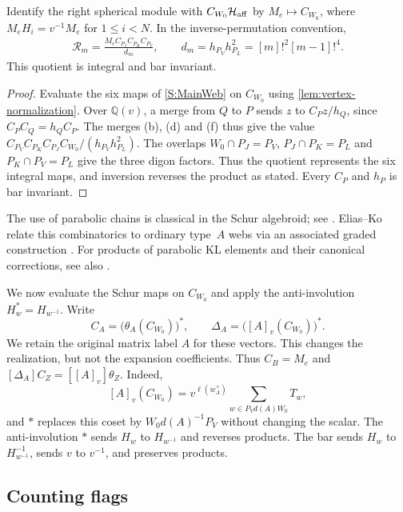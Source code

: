 \documentclass[a4paper,11pt]{amsart}
\numberwithin{equation}{subsection}
\theoremstyle{plain}
\theoremstyle{definition}
\theoremstyle{remark}
\begin{document}
\begin{lemma}\label{lem:main-symmetrizer}
Identify the right spherical module with $C_{W_0}\mathcal H_{\rm aff}$
by $M_e\mapsto C_{W_0}$, where $M_eH_i=v^{-1}M_e$ for $1\le i<N$.
In the inverse-permutation convention,
\begin{gather}\label{eq:marked-symmetrizer}
\mathcal R_m=\frac{M_eC_{P_J}C_{P_K}C_{P_V}}{d_m},\qquad
d_m=h_{P_V}h_{P_L}^2=[m]!^2[m-1]!^4.
\end{gather}
This quotient is integral and bar invariant.
\end{lemma}

\begin{proof}
Evaluate the six maps of \autoref{S:MainWeb} on $C_{W_0}$ using
\autoref{lem:vertex-normalization}. Over $\mathbb Q(v)$,
a merge from $Q$ to $P$ sends $z$ to $C_Pz/h_Q$, since
$C_PC_Q=h_QC_P$. The merges (b), (d) and (f) thus give
the value $C_{P_V}C_{P_K}C_{P_J}C_{W_0}/(h_{P_V}h_{P_L}^2)$.
The overlaps $W_0\cap P_J=P_V$, $P_J\cap P_K=P_L$ and $P_K\cap P_V=P_L$
give the three digon factors. Thus the quotient represents the
six integral maps, and inversion reverses the product as stated.
Every $C_P$ and $h_P$ is bar invariant.
\end{proof}

\begin{remark}
The use of parabolic chains is classical in the Schur algebroid;
see \cite{Williamson}. Elias--Ko relate this combinatorics
to ordinary type~$A$ webs via an associated graded construction
\cite{EliasKo}.
For products of parabolic KL elements and their canonical
corrections, see also \cite{AgrawalSotirov}.
\end{remark}

We now evaluate the Schur maps on $C_{W_0}$ and apply the
anti-involution $H_w^*=H_{w^{-1}}$. Write
\[
C_A=\bigl(\theta_A(C_{W_0})\bigr)^*,\qquad
\Delta_A=\bigl([A]_v(C_{W_0})\bigr)^*.
\]
We retain the original matrix label $A$ for these vectors.
This changes the realization, but not the expansion coefficients.
Thus $C_B=M_e$ and
$[\Delta_A]C_Z=[[A]_v]\theta_Z$. Indeed,
\[
[A]_v(C_{W_0})=v^{\ell(w_A^+)}
\sum_{w\in P_Vd(A)W_0}T_w,
\]
and $*$ replaces this coset by $W_0d(A)^{-1}P_V$ without changing
the scalar. 
The anti-involution $*$ sends $H_w$ to $H_{w^{-1}}$ and
reverses products. The bar sends $H_w$ to $H_{w^{-1}}^{-1}$,
sends $v$ to $v^{-1}$, and preserves products.

\subsection{Counting flags}
\end{document}
